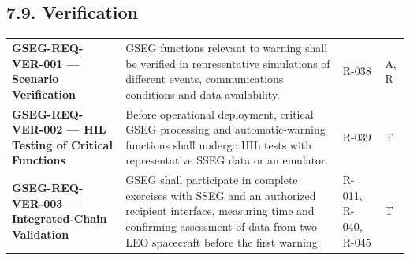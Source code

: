 \subsection{7.9. Verification}\label{integrated-verification}

\begingroup{}
\begin{longtable}{|P{0.27}|P{0.46}|P{0.16}|P{0.11}|}
\hline{}
 &  &  & \\ \hline
\endhead
\hline\endlastfoot
\textbf{GSEG-REQ-VER-001 — Scenario Verification} & GSEG functions relevant to warning shall be verified in representative simulations of different events, communications conditions and data availability. & R-038 & A, R\\ \hline
\textbf{GSEG-REQ-VER-002 — HIL Testing of Critical Functions} & Before operational deployment, critical GSEG processing and automatic-warning functions shall undergo HIL tests with representative SSEG data or an emulator. & R-039 & T\\ \hline
\textbf{GSEG-REQ-VER-003 — Integrated-Chain Validation} & GSEG shall participate in complete exercises with SSEG and an authorized recipient interface, measuring time and confirming assessment of data from two LEO spacecraft before the first warning. & R-011, R-040, R-045 & T\\*
\end{longtable}
\endgroup

